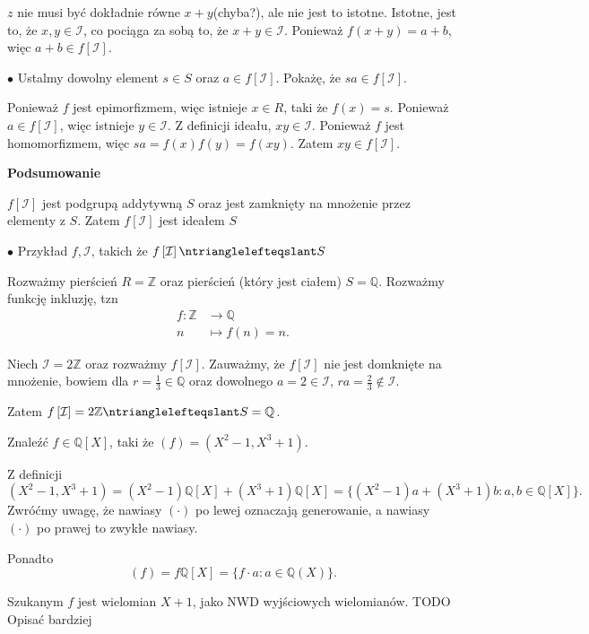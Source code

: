 \begin{solution}
$z$ nie musi być dokładnie równe $x+y$(chyba?), ale  nie jest to istotne. Istotne, jest to, że $x,y \in \mathcal{I}$, co pociąga za sobą to, że  $x+y \in \mathcal{I}$. Ponieważ $f\left( x+y \right) = a+b$, więc $a+b \in f\left[ \mathcal{I} \right] $.

\noindent$\bullet$ Ustalmy dowolny element $s \in S$ oraz $a \in f\left[ \mathcal{I} \right]$. Pokażę, że $sa \in f\left[ \mathcal{I} \right]$. 

Ponieważ $f$ jest epimorfizmem, więc istnieje $x \in R$, taki że $f\left( x \right) = s$. Ponieważ $a \in f\left[ \mathcal{I} \right] $, więc istnieje $y \in \mathcal{I}$. Z definicji ideału, $xy \in \mathcal{I}$. Ponieważ $f$ jest homomorfizmem, więc $sa = f\left( x \right) f\left( y \right) = f\left( xy \right) $. Zatem  $xy \in f\left[ \mathcal{I} \right] $.

\noindent \textbf{Podsumowanie} 

$f\left[ \mathcal{I} \right] $ jest podgrupą addytywną $S$ oraz jest zamknięty na mnożenie przez elementy z $S$. Zatem $f\left[ \mathcal{I} \right] $ jest ideałem $S$

\noindent$\bullet$ Przykład $f, \mathcal{I}$, takich że $f\left[ \mathcal{I} \right] \ntrianglelefteqslant S$

Rozważmy pierścień $R = \mathbb{Z} $ oraz pierścień (który jest ciałem) $S = \mathbb{Q} $. Rozważmy funkcję inkluzję, tzn
\begin{align*}
	f: \mathbb{Z}  &\longrightarrow \mathbb{Q}  \\
	n &\longmapsto f(n) = n
.\end{align*}

Niech $\mathcal{I} = 2\mathbb{Z} $ oraz rozważmy $f\left[ \mathcal{I} \right] $. Zauważmy, że $f\left[ \mathcal{I} \right] $ nie jest domknięte na mnożenie, bowiem dla $r = \frac{1}{3} \in \mathbb{Q} $ oraz dowolnego $a = 2 \in \mathcal{I}$, $ra = \frac{2}{3}\not\in \mathcal{I}$.

Zatem $f\left[ \mathcal{I} \right] = 2\mathbb{Z} \ntrianglelefteqslant S = \mathbb{Q} $.
\end{solution} 
\begin{problem}[4]
	Znaleźć $f\in \mathbb{Q}\left[ X \right]$, taki że $\left( f \right) = \left( X^2-1, X^3+1 \right) $.
\end{problem} 
\begin{solution}
	 Z definicji 
	 \[
		 \left( X^2-1, X^3+1 \right) = \left( X^2-1 \right)\mathbb{Q} \left[ X \right] + \left( X^3+1 \right)\mathbb{Q} \left[ X \right] = \{\left( X^2-1 \right)a + \left( X^3+1 \right)b : a,b \in \mathbb{Q}\left[ X \right]   \} 
	 .\] 
	Zwróćmy uwagę, że nawiasy $\left( \cdot  \right) $ po lewej oznaczają generowanie, a nawiasy $\left( \cdot  \right) $ po prawej to zwykłe nawiasy.

	Ponadto 
	\[
	\left( f \right) = f\mathbb{Q} \left[ X \right] = \{f\cdot a : a \in \mathbb{Q} \left( X \right) \} 
	.\] 

	Szukanym $f$ jest wielomian $X+1$, jako NWD wyjściowych wielomianów. TODO Opisać bardziej
\end{solution} 
